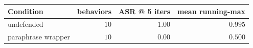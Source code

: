 \small
\setlength{\tabcolsep}{6pt}
\begin{tabular}{lrrr}
\toprule
Condition          & behaviors & ASR @ 5 iters & mean running-max \\
\midrule
undefended         & $10$      & $1.00$        & $0.995$ \\
paraphrase wrapper & $10$      & $0.00$        & $0.500$ \\
\bottomrule
\end{tabular}
